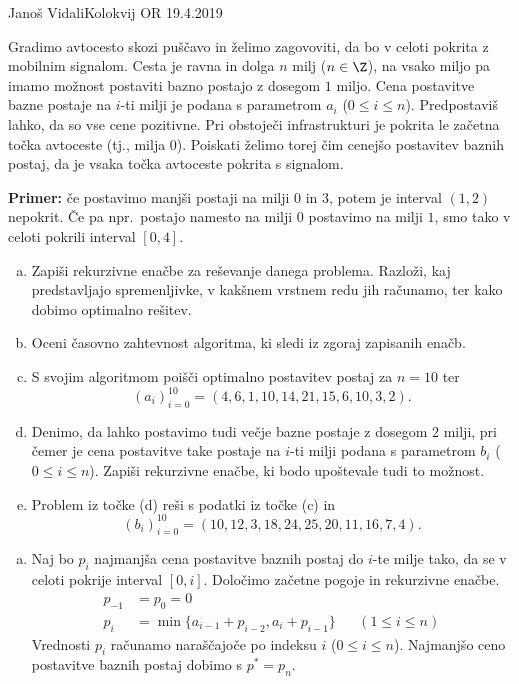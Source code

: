 \begin{naloga}{Janoš Vidali}{Kolokvij OR 19.4.2019}
\begin{vprasanje}
Gradimo avtocesto skozi puščavo in želimo zagovoviti,
da bo v celoti pokrita z mobilnim signalom.
Cesta je ravna in dolga $n$ milj ($n \in \Z$),
na vsako miljo pa imamo možnost postaviti bazno postajo z dosegom $1$ miljo.
Cena postavitve bazne postaje na $i$-ti milji
je podana s parametrom $a_i$ ($0 \le i \le n$).
Predpostaviš lahko, da so vse cene pozitivne.
Pri obstoječi infrastrukturi je pokrita le začetna točka avtoceste
(tj., milja $0$).
Poiskati želimo torej čim cenejšo postavitev baznih postaj,
da je vsaka točka avtoceste pokrita s signalom.

\medskip
\noindent
{\bf Primer:} če postavimo manjši postaji na milji $0$ in $3$,
potem je interval $(1, 2)$ nepokrit.
Če pa npr.~postajo namesto na milji $0$ postavimo na milji $1$,
smo tako v celoti pokrili interval $[0, 4]$.

\begin{enumerate}[(a)]
\item Zapiši rekurzivne enačbe za reševanje danega problema.
Razloži, kaj pred\-stav\-lja\-jo spremenljivke,
v kakšnem vrstnem redu jih računamo,
ter kako dobimo optimalno rešitev.

\item Oceni časovno zahtevnost algoritma, ki sledi iz zgoraj zapisanih enačb.

\item S svojim algoritmom poišči optimalno postavitev postaj za $n = 10$ ter
$$
(a_i)_{i=0}^{10} = (4,  6,  1, 10, 14, 21, 15,  6, 10,  3,  2) .
$$

\item Denimo, da lahko postavimo tudi večje bazne postaje z dosegom $2$ milji,
pri čemer je cena postavitve take postaje na $i$-ti milji
podana s parametrom $b_i$ ($0 \le i \le n$).
Zapiši rekurzivne enačbe, ki bodo upoštevale tudi to možnost.

\item Problem iz točke (d) reši s podatki iz točke (c) in
$$
(b_i)_{i=0}^{10} = (10, 12, 3, 18, 24, 25, 20, 11, 16,  7,  4) .
$$
\end{enumerate}
\end{vprasanje}

\begin{odgovor}
\begin{enumerate}[(a)]
\item Naj bo $p_i$ najmanjša cena postavitve baznih postaj
do $i$-te milje tako,
da se v celoti pokrije interval $[0, i]$.
Določimo začetne pogoje in rekurzivne enačbe.
\begin{align*}
p_{-1} &= p_0 = 0 \\
p_i &= \min\{a_{i-1} + p_{i-2}, a_i + p_{i-1}\} && (1 \le i \le n)
\end{align*}
Vrednosti $p_i$ računamo naraščajoče po indeksu $i$ ($0 \le i \le n$).
Najmanjšo ceno postavitve baznih postaj dobimo s $p^* = p_n$.


\end{enumerate}
\end{odgovor}
\end{naloga}
